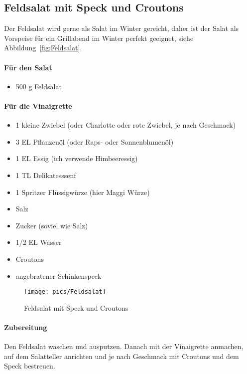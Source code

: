 \subsection{Feldsalat mit Speck und Croutons}
Der Feldsalat wird gerne als Salat im Winter gereicht, daher ist der Salat als Vorspeise für ein Grillabend im Winter perfekt geeignet, siehe 
Abbildung~\vref{fig:Feldsalat}.

\paragraph{Für den Salat}

\begin{itemize}[noitemsep]
	\item 500 g Feldsalat
\end{itemize}	

\paragraph{Für die Vinaigrette}

\begin{itemize}[noitemsep]	
	\item 1 kleine Zwiebel  (oder Charlotte oder rote Zwiebel, je nach Geschmack)
	\item 3 EL Pflanzenöl (oder Raps- oder Sonnenblumenöl)
	\item 1 EL Essig (ich verwende Himbeeressig)
	\item 1 TL Delikatesssenf
	\item 1 Spritzer Flüssigwürze (hier Maggi Würze)
	\item Salz 
	\item Zucker (soviel wie Salz)
	\item 1/2 EL Wasser
	\item Croutons
	\item angebratener Schinkenspeck
\end{itemize}

\begin{figure}[h]
	\centering
	\texttt{[image: pics/Feldsalat]}
	\caption{Feldsalat mit Speck und Croutons}
	\label{fig:Feldsalat}
\end{figure}

\paragraph{Zubereitung}

Den Feldsalat waschen und ausputzen. Danach mit der Vinaigrette anmachen, auf dem Salatteller anrichten
und je nach Geschmack mit Croutons und dem Speck bestreuen.  

